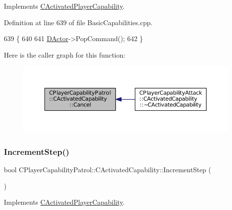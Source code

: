 Implements \hyperlink{classCActivatedPlayerCapability_a5cde83be468e262ad054d81e28684a81}{C\+Activated\+Player\+Capability}.



Definition at line 639 of file Basic\+Capabilities.\+cpp.


\begin{DoxyCode}
639                                                         \{
640 
641     \hyperlink{classCActivatedPlayerCapability_a54ca944b47bff2718330639941d402b0}{DActor}->PopCommand();
642 \}
\end{DoxyCode}
Here is the caller graph for this function\+:
\nopagebreak
\begin{figure}[H]
\begin{center}
\leavevmode
\includegraphics[width=350pt]{classCPlayerCapabilityPatrol_1_1CActivatedCapability_a36165c232eb283ce4a92bd4606480c73_icgraph}
\end{center}
\end{figure}
\hypertarget{classCPlayerCapabilityPatrol_1_1CActivatedCapability_a576a71646225c0723a0ed9e77add01fd}{}\label{classCPlayerCapabilityPatrol_1_1CActivatedCapability_a576a71646225c0723a0ed9e77add01fd} 
\subsubsection{\texorpdfstring{Increment\+Step()}{IncrementStep()}}
{\footnotesize\ttfamily bool C\+Player\+Capability\+Patrol\+::\+C\+Activated\+Capability\+::\+Increment\+Step (\begin{DoxyParamCaption}{ }\end{DoxyParamCaption})\hspace{0.3cm}{\ttfamily [virtual]}}



Implements \hyperlink{classCActivatedPlayerCapability_a943b5999a57504399293250382c0ec6a}{C\+Activated\+Player\+Capability}.



